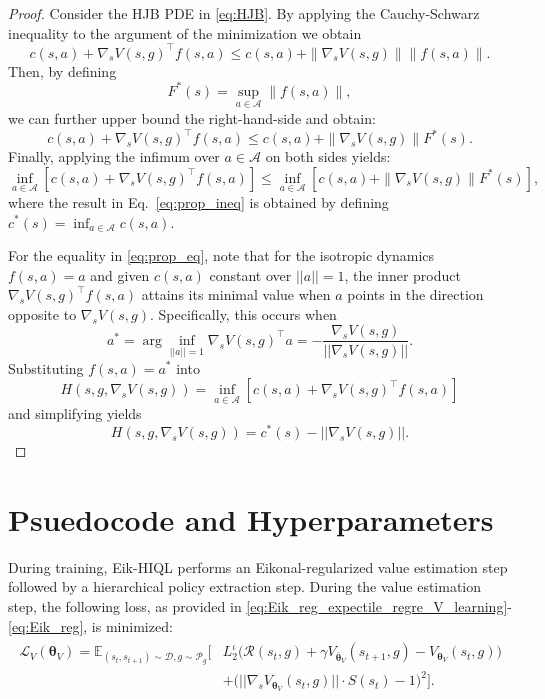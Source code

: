 \documentclass{article}
\theoremstyle{plain}
\theoremstyle{definition}
\theoremstyle{remark}
\begin{document}
\begin{proof}
Consider the HJB PDE in \eqref{eq:HJB}. By applying the Cauchy-Schwarz inequality to the argument of the minimization we obtain
$$c(s, a) + \nabla_s V(s,g)^{\top}f(s,a) \leq c(s,a) + \|\nabla_sV(s,g)\|\|f(s,a)\|.$$
Then, by defining
$$F^*(s) = \sup_{a \in \mathcal{A}}\|f(s,a)\|,$$
we can further upper bound the right-hand-side and obtain:
$$c(s, a) + \nabla_s V(s,g)^{\top}f(s,a) \leq c(s,a) + \|\nabla_sV(s,g)\|F^*(s).$$
Finally, applying the infimum over $a \in \mathcal{A}$ on both sides yields:
$$\inf_{a \in \mathcal{A}} [c(s, a) + \nabla_s V(s,g)^{\top}f(s,a)] \leq \inf_{a \in \mathcal{A}}[c(s,a) + \|\nabla_sV(s,g)\|F^*(s)],$$
where the result in Eq.~\eqref{eq:prop_ineq} is obtained by defining $c^*(s) = \inf_{a \in \mathcal{A}}c(s,a)$.

For the equality in \eqref{eq:prop_eq}, note that for the isotropic dynamics $f(s,a)=a$ and given $c(s,a)$ constant over $||a||=1$, the inner product $\nabla_s V(s, g)^{\intercal}f(s,a)$ attains its minimal value when $a$ points in the direction opposite to $\nabla_s V(s, g)$. Specifically, this occurs when 
$$a^* = \arg\inf_{||a||=1} \nabla_s V(s, g)^{\intercal}a = -\frac{\nabla_s V(s, g)}{||\nabla_s V(s, g)||}.$$ 
Substituting $f(s,a) = a^*$ into 
$$H(s,g,\nabla_s V(s,g)) = \inf_{a \in \mathcal{A}}[c(s, a) + \nabla_s V(s,g)^{\top}f(s,a)]$$
and simplifying yields 
$$H(s,g,\nabla_s V(s,g)) = c^*(s) - ||\nabla_s V(s, g)||.$$
\end{proof}

\section{Psuedocode and Hyperparameters}
\label{sec:app_psuedocode_hyperparam}

During training, Eik-HIQL performs an Eikonal-regularized value estimation step followed by a hierarchical policy extraction step. During the value estimation step, the following loss, as provided in \eqref{eq:Eik_reg_expectile_regre_V_learning}-\eqref{eq:Eik_reg}, is minimized: 
\begin{align}
\begin{split}
    \mathcal{L}_V(\bm{\theta}_V) = \mathbb{E}_{(s_t,s_{t+1}) \sim \mathcal{D}, g \sim \mathcal{P}_g}\Big[&L_2^{\iota}\big(\mathcal{R}(s_t,g) + \gamma V_{\bar{\bm{\theta}}_V} (s_{t+1}, g) - V_{\bm{\theta}_V}(s_t, g)\big) \\
    &+ \big(||\nabla_s V_{\bm{\theta}_V}(s_t, g)|| \cdot S(s_t) - 1\big)^2\Big].
\end{split}
\label{eq_app:PI_GCVF_loss}
\end{align}
\end{document}

